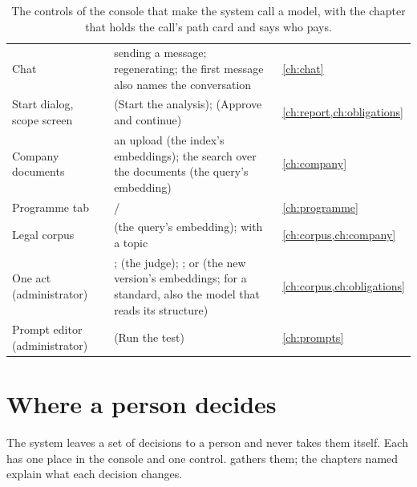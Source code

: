 \begin{table}[H]
\caption{The controls of the console that make the system call a model, with the chapter that
holds the call's path card and says who pays.}\label{tab:console:modelbuttons}
\begin{tabularx}{\textwidth}{@{}L{40mm}YL{28mm}@{}}
\toprule
{} &  &  \\
\midrule
Chat & sending a message; regenerating; the first message also names the conversation &
\cref{ch:chat} \\
Start dialog, scope screen &  (Start the analysis); 
(Approve and continue) & \cref{ch:report,ch:obligations} \\
Company documents & an upload (the index's embeddings); the search over the documents (the query's
embedding) & \cref{ch:company} \\
Programme tab &  /  & \cref{ch:programme} \\
Legal corpus &  (the query's embedding);  with a topic &
\cref{ch:corpus,ch:company} \\
One act (administrator) & ;  (the judge);
;  or  (the
new version's embeddings; for a standard, also the model that reads its structure) &
\cref{ch:corpus,ch:obligations} \\
Prompt editor (administrator) &  (Run the test) & \cref{ch:prompts} \\
\bottomrule
\end{tabularx}
\end{table}

\section{Where a person decides}\label{sec:console:decisions}

The system leaves a set of decisions to a person and never takes them itself. Each has one place
in the console and one control.  gathers them; the chapters named
explain what each decision changes.

